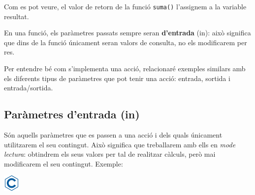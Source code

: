\documentclass[]{book}
\newenvironment{Shaded}{\begin{snugshade}}{\end{snugshade}}
\newcommand{\DataTypeTok}[1]{\textcolor[rgb]{0.13,0.29,0.53}{#1}}
\newcommand{\DecValTok}[1]{\textcolor[rgb]{0.00,0.00,0.81}{#1}}
\newcommand{\SpecialCharTok}[1]{\textcolor[rgb]{0.00,0.00,0.00}{#1}}
\newcommand{\StringTok}[1]{\textcolor[rgb]{0.31,0.60,0.02}{#1}}
\newcommand{\ImportTok}[1]{#1}
\newcommand{\CommentTok}[1]{\textcolor[rgb]{0.56,0.35,0.01}{\textit{#1}}}
\newcommand{\ControlFlowTok}[1]{\textcolor[rgb]{0.13,0.29,0.53}{\textbf{#1}}}
\newcommand{\PreprocessorTok}[1]{\textcolor[rgb]{0.56,0.35,0.01}{\textit{#1}}}
\newcommand{\NormalTok}[1]{#1}
\begin{document}
Com es pot veure, el valor de retorn de la funció \texttt{suma()}
l'assignem a la variable resultat.

En una funció, els paràmetres passats sempre seran \textbf{d'entrada}
(in): això significa que dins de la funció únicament seran valors de
consulta, no els modificarem per res.

Per entendre bé com s'implementa una acció, relacionaré exemples
similars amb els diferents tipus de paràmetres que pot tenir una acció:
entrada, sortida i entrada/sortida.

\subsection{Paràmetres d'entrada (in)}\label{parametres-dentrada-in}

Són aquells paràmetres que es passen a una acció i dels quals únicament
utilitzarem el seu contingut. Això significa que treballarem amb ells en
\emph{mode lectura}: obtindrem els seus valors per tal de realitzar
càlculs, però mai modificarem el seu contingut. Exemple:

\includegraphics{./img/c.png}

\begin{Shaded}
\end{Shaded}
\end{document}
